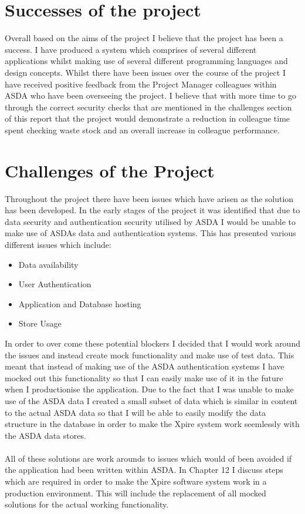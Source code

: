 \documentclass[a4paper,11pt]{report}
\begin{document}
\section {Successes of the project}
Overall based on the aims of the project I believe that the project has been a success. I have produced a system which comprises of several different applications whilst making use of several different programming languages and design concepts. 
Whilst there have been issues over the course of the project I have received positive feedback from the Project Manager colleagues within ASDA who have been overseeing the project.
I believe that with more time to go through the correct security checks that are mentioned in the challenges section of this report that the project would demonstrate a reduction in 
colleague time spent checking waste stock and an overall increase in colleague performance. 

\section {Challenges of the Project}
Throughout the project there have been issues which have arisen as the solution has been developed. In the early stages of the project it was identified that due to data security and authentication security utilised by ASDA I would be unable to make use of ASDAs data and authentication systems. This has presented various different issues which include:
\begin{itemize}
    \item Data availability
    \item User Authentication
    \item Application and Database hosting
    \item Store Usage
\end{itemize}
 In order to over come these potential blockers I decided that I would work around the issues and instead create mock functionality and make use of test data. This meant that instead of making use of the ASDA authentication systems I have mocked out this functionality so that I can easily make use of it in the future when I productionise the application. 
 Due to the fact that I was unable to make use of the ASDA data I created a small subset of data which is similar in content to the actual ASDA data so that I will be able to easily modify the data structure in the database in order to make the Xpire system work seemlessly with the ASDA data stores. 
\\
\\
 All of these solutions are work arounds to issues which would of been avoided if the application had been written within ASDA. In Chapter 12 I discuss steps which are required in order to make the Xpire software system work in a production environment. This will include the replacement of all mocked solutions for the actual working functionality. 
\end{document}
